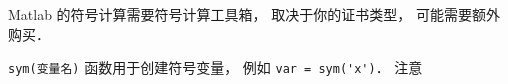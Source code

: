 
Matlab 的符号计算需要符号计算工具箱， 取决于你的证书类型， 可能需要额外购买． 

\verb|sym(变量名)| 函数用于创建符号变量， 例如 \verb|var = sym('x')|． 注意 \verb||
